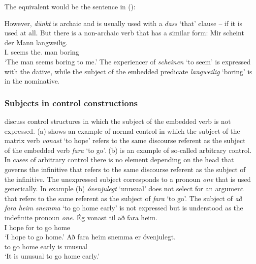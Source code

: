 \noindent
The  equivalent would be the sentence in ():
{
\z}

\noindent
However, \emph{dünkt} is archaic and is usually used with a \emph{dass} `that' clause -- if it is used at
all. But there is a non-archaic verb that has a similar form:
\ea
\gll Mir scheint der Mann langweilig.\\
     I.\DAT{} seems the.\NOM{} man boring\\\german
\glt `The man seems boring to me.'
\z
The experiencer of \emph{scheinen} `to seem' is expressed with the dative, while the subject of the
embedded predicate \emph{langweilig} `boring' is in the nominative.


\subsubsection{Subjects in control constructions}
\label{sec-subject-control}

\citet*[Section~2.7]{ZMT85a} discuss control structures in which the subject of the embedded verb is
not expressed. (a) shows an example of normal control in which the subject of the matrix verb
\emph{vonast} `to hope' refers to the same discourse referent as the subject of the embedded verb \emph{fara} `to
go'. (b) is an example of so-called arbitrary control. In cases of arbitrary control there is
no element depending on the head that governs the infinitive that refers to the same discourse
referent as the subject of the infinitive. The unexpressed subject corresponds to a pronoun \emph{one} that is
used generically. In example (b) \emph{óvenjulegt} `unusual' does not select for an argument
that refers to the same referent as the subject of \emph{fara} `to go'. The subject of \emph{að fara
  heim snemma} `to go home early' is not expressed but is understood as the indefinite pronoun \emph{one}.
\eal
\ex
\gll Ég  vonast til að fara heim.\\
     I   hope   for to go   home\\\icelandic
\glt `I hope to go home.'
\ex
\gll Að fara heim snemma er óvenjulegt.\\
     to go home   early is unusual\\
\glt `It is unusual to go home early.'
\zl

